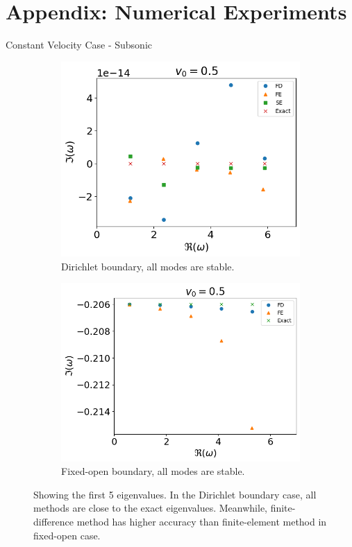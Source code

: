 \section{Appendix: Numerical Experiments}
\begin{frame}{Constant Velocity Case - Subsonic}
  \begin{figure}[H]
    \centering
    \begin{subfigure}{0.45\textwidth}
      \includegraphics[width=0.9\linewidth]{figures/numerical-experiments/fixed-fixed/constant-v-v0=0.5}
      \caption{Dirichlet boundary, all modes are stable.}
    \end{subfigure}%
    \begin{subfigure}{0.45\textwidth}
      \includegraphics[width=\linewidth]{figures/numerical-experiments/fixed-open/constant-v-v0=0.5}
      \caption{Fixed-open boundary, all modes are stable.}
    \end{subfigure}
    \caption{Showing the first 5 eigenvalues. In the Dirichlet boundary case, all methods are close to the exact eigenvalues. Meanwhile, finite-difference method has higher accuracy than finite-element method in fixed-open case.}
  \end{figure}
\end{frame}


